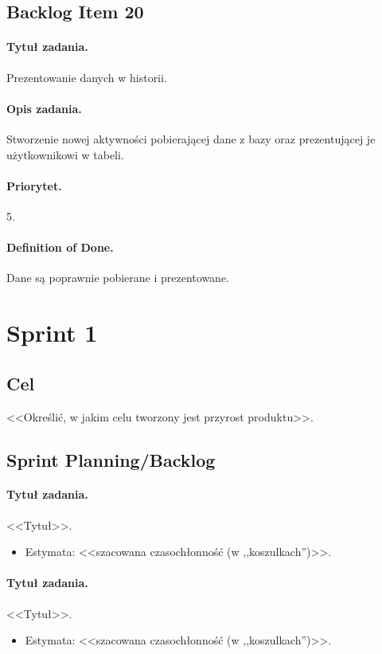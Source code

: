 \documentclass[a4paper]{article}
\begin{document}
\subsection{Backlog Item 20}
\paragraph{Tytuł zadania.} Prezentowanie danych w historii.
\paragraph{Opis zadania.} Stworzenie nowej aktywności pobierającej dane z bazy oraz prezentującej je użytkownikowi w tabeli.
\paragraph{Priorytet.} 5.
\paragraph{Definition of Done.} Dane są poprawnie pobierane i prezentowane.



\section{Sprint 1}
\subsection{Cel} <<Określić, w jakim celu tworzony jest przyrost produktu>>.
\subsection{Sprint Planning/Backlog}

\paragraph{Tytuł zadania.} <<Tytuł>>.
\begin{itemize}
\item Estymata: <<szacowana czasochłonność (w ,,koszulkach'')>>.
\end{itemize}

\paragraph{Tytuł zadania.} <<Tytuł>>.
\begin{itemize}
\item Estymata: <<szacowana czasochłonność (w ,,koszulkach'')>>.
\end{itemize}
\end{document}
